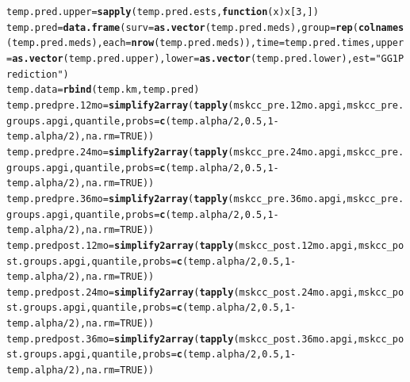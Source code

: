 \documentclass{article}\usepackage[]{graphicx}\usepackage[]{color}
\makeatletter
\newcommand{\hlnum}[1]{\textcolor[rgb]{0.686,0.059,0.569}{#1}}%
\newcommand{\hlstr}[1]{\textcolor[rgb]{0.192,0.494,0.8}{#1}}%
\newcommand{\hlopt}[1]{\textcolor[rgb]{0,0,0}{#1}}%
\newcommand{\hlstd}[1]{\textcolor[rgb]{0.345,0.345,0.345}{#1}}%
\newcommand{\hlkwa}[1]{\textcolor[rgb]{0.161,0.373,0.58}{\textbf{#1}}}%
\newcommand{\hlkwb}[1]{\textcolor[rgb]{0.69,0.353,0.396}{#1}}%
\newcommand{\hlkwc}[1]{\textcolor[rgb]{0.333,0.667,0.333}{#1}}%
\newcommand{\hlkwd}[1]{\textcolor[rgb]{0.737,0.353,0.396}{\textbf{#1}}}%
\newenvironment{kframe}{%
 \def\at@end@of@kframe{}%
 \ifinner\ifhmode%
  \def\at@end@of@kframe{\end{minipage}}%
  \begin{minipage}{\columnwidth}%
 \fi\fi%
 \def\FrameCommand##1{\hskip\@totalleftmargin \hskip-\fboxsep
 \colorbox{shadecolor}{##1}\hskip-\fboxsep
     \hskip-\linewidth \hskip-\@totalleftmargin \hskip\columnwidth}%
 \MakeFramed {\advance\hsize-\width
   \@totalleftmargin\z@ \linewidth\hsize
   \@setminipage}}%
 {\par\unskip\endMakeFramed%
 \at@end@of@kframe}
\newenvironment{knitrout}{}{} %
\makeatother
\begin{document}
\begin{knitrout}
\begin{kframe}
\begin{alltt}
\hlstd{temp.pred.upper} \hlkwb{=} \hlkwd{sapply}\hlstd{(temp.pred.ests,} \hlkwa{function}\hlstd{(}\hlkwc{x}\hlstd{) x[}\hlnum{3}\hlstd{,])}
\hlstd{temp.pred} \hlkwb{=} \hlkwd{data.frame}\hlstd{(}\hlkwc{surv} \hlstd{=} \hlkwd{as.vector}\hlstd{(temp.pred.meds),} \hlkwc{group} \hlstd{=} \hlkwd{rep}\hlstd{(}\hlkwd{colnames}\hlstd{(temp.pred.meds),} \hlkwc{each} \hlstd{=} \hlkwd{nrow}\hlstd{(temp.pred.meds)),} \hlkwc{time} \hlstd{= temp.pred.times,} \hlkwc{upper} \hlstd{=} \hlkwd{as.vector}\hlstd{(temp.pred.upper),} \hlkwc{lower} \hlstd{=} \hlkwd{as.vector}\hlstd{(temp.pred.lower),} \hlkwc{est} \hlstd{=} \hlstr{"GG1 Prediction"}\hlstd{)}
\hlstd{temp.data} \hlkwb{=} \hlkwd{rbind}\hlstd{(temp.km, temp.pred)}
\hlstd{temp.predpre.12mo} \hlkwb{=} \hlkwd{simplify2array}\hlstd{(}\hlkwd{tapply}\hlstd{(mskcc_pre.12mo.apgi, mskcc_pre.groups.apgi, quantile,} \hlkwc{probs} \hlstd{=} \hlkwd{c}\hlstd{(temp.alpha}\hlopt{/}\hlnum{2}\hlstd{,} \hlnum{0.5}\hlstd{,} \hlnum{1}\hlopt{-}\hlstd{temp.alpha}\hlopt{/}\hlnum{2}\hlstd{),} \hlkwc{na.rm} \hlstd{=} \hlnum{TRUE}\hlstd{))}
\hlstd{temp.predpre.24mo} \hlkwb{=} \hlkwd{simplify2array}\hlstd{(}\hlkwd{tapply}\hlstd{(mskcc_pre.24mo.apgi, mskcc_pre.groups.apgi, quantile,} \hlkwc{probs} \hlstd{=} \hlkwd{c}\hlstd{(temp.alpha}\hlopt{/}\hlnum{2}\hlstd{,} \hlnum{0.5}\hlstd{,} \hlnum{1}\hlopt{-}\hlstd{temp.alpha}\hlopt{/}\hlnum{2}\hlstd{),} \hlkwc{na.rm} \hlstd{=} \hlnum{TRUE}\hlstd{))}
\hlstd{temp.predpre.36mo} \hlkwb{=} \hlkwd{simplify2array}\hlstd{(}\hlkwd{tapply}\hlstd{(mskcc_pre.36mo.apgi, mskcc_pre.groups.apgi, quantile,} \hlkwc{probs} \hlstd{=} \hlkwd{c}\hlstd{(temp.alpha}\hlopt{/}\hlnum{2}\hlstd{,} \hlnum{0.5}\hlstd{,} \hlnum{1}\hlopt{-}\hlstd{temp.alpha}\hlopt{/}\hlnum{2}\hlstd{),} \hlkwc{na.rm} \hlstd{=} \hlnum{TRUE}\hlstd{))}
\hlstd{temp.predpost.12mo} \hlkwb{=} \hlkwd{simplify2array}\hlstd{(}\hlkwd{tapply}\hlstd{(mskcc_post.12mo.apgi, mskcc_post.groups.apgi, quantile,} \hlkwc{probs} \hlstd{=} \hlkwd{c}\hlstd{(temp.alpha}\hlopt{/}\hlnum{2}\hlstd{,} \hlnum{0.5}\hlstd{,} \hlnum{1}\hlopt{-}\hlstd{temp.alpha}\hlopt{/}\hlnum{2}\hlstd{),} \hlkwc{na.rm} \hlstd{=} \hlnum{TRUE}\hlstd{))}
\hlstd{temp.predpost.24mo} \hlkwb{=} \hlkwd{simplify2array}\hlstd{(}\hlkwd{tapply}\hlstd{(mskcc_post.24mo.apgi, mskcc_post.groups.apgi, quantile,} \hlkwc{probs} \hlstd{=} \hlkwd{c}\hlstd{(temp.alpha}\hlopt{/}\hlnum{2}\hlstd{,} \hlnum{0.5}\hlstd{,} \hlnum{1}\hlopt{-}\hlstd{temp.alpha}\hlopt{/}\hlnum{2}\hlstd{),} \hlkwc{na.rm} \hlstd{=} \hlnum{TRUE}\hlstd{))}
\hlstd{temp.predpost.36mo} \hlkwb{=} \hlkwd{simplify2array}\hlstd{(}\hlkwd{tapply}\hlstd{(mskcc_post.36mo.apgi, mskcc_post.groups.apgi, quantile,} \hlkwc{probs} \hlstd{=} \hlkwd{c}\hlstd{(temp.alpha}\hlopt{/}\hlnum{2}\hlstd{,} \hlnum{0.5}\hlstd{,} \hlnum{1}\hlopt{-}\hlstd{temp.alpha}\hlopt{/}\hlnum{2}\hlstd{),} \hlkwc{na.rm} \hlstd{=} \hlnum{TRUE}\hlstd{))}

\end{alltt}
\end{kframe}
\end{knitrout}
\end{document}
